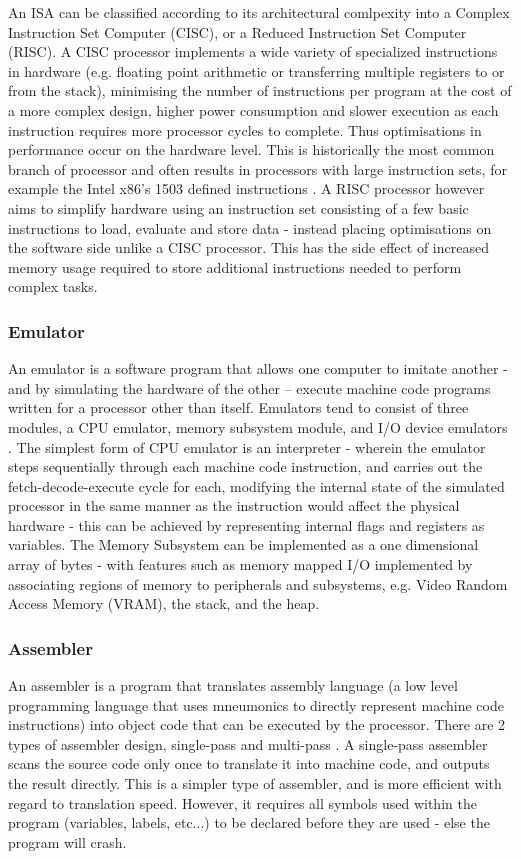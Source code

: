 An ISA can be classified according to its architectural comlpexity into a Complex Instruction Set Computer (CISC), or a Reduced Instruction Set Computer (RISC). A CISC processor implements a wide variety of specialized instructions in hardware (e.g. floating point arithmetic or transferring multiple registers to or from the stack), minimising the number of instructions per program at the cost of a more complex design, higher power consumption and slower execution as each instruction requires more processor cycles to complete. \textcite{gfg-risc-vs-cisc} Thus optimisations in performance occur on the hardware level. This is historically the most common branch of processor and often results in processors with large instruction sets, for example the Intel x86's 1503 defined instructions \textcite{ryg-blog}. A RISC processor however aims to simplify hardware using an instruction set consisting of a few basic instructions to load, evaluate and store data - instead placing optimisations on the software side unlike a CISC processor. This has the side effect of increased memory usage required to store additional instructions needed to perform complex tasks.

\subsubsection{Emulator}
\label{sec:Emulator}
An emulator is a software program that allows one computer to imitate another - and by simulating the hardware of the other – execute machine code programs written for a processor other than itself. Emulators tend to consist of three modules, a CPU emulator, memory subsystem module, and I/O device emulators \textcite{retroreversing}. The simplest form of CPU emulator is an interpreter - wherein the emulator steps sequentially through each machine code instruction, and carries out the fetch-decode-execute cycle for each, modifying the internal state of the simulated processor in the same manner as the instruction would affect the physical hardware - this can be achieved by representing internal flags and registers as variables. The Memory Subsystem can be implemented as a one dimensional array of bytes - with features such as memory mapped I/O implemented by associating regions of memory to peripherals and subsystems, e.g. Video Random Access Memory (VRAM), the stack, and the heap. 

\subsubsection{Assembler}
\label{sec:Assembler}
An assembler is a program that translates assembly language (a low level programming language that uses mneumonics to directly represent machine code instructions) into object code that can be executed by the processor. There are 2 types of assembler design, single-pass and multi-pass \cite{TOPPR-assembler}. A single-pass assembler scans the source code only once to translate it into machine code, and outputs the result directly. This is a simpler type of assembler, and is more efficient with regard to translation speed. However, it requires all symbols used within the program (variables, labels, etc...) to be declared before they are used - else the program will crash. 

